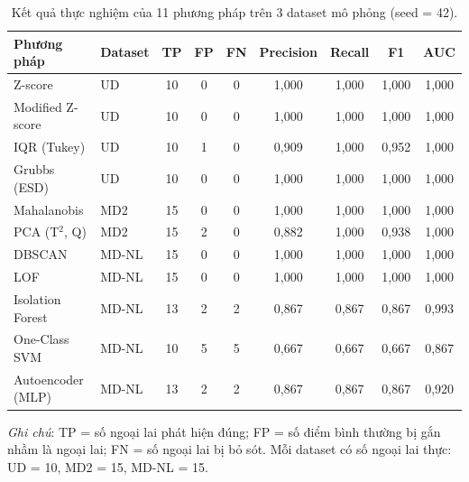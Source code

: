 \begin{table}[ht]
\centering
\caption{Kết quả thực nghiệm của 11 phương pháp trên 3 dataset mô phỏng (seed = 42).}
\label{tab:experiment-results}
\small
\begin{tabular}{llccccccc}
\toprule
\textbf{Phương pháp} & \textbf{Dataset} & \textbf{TP} & \textbf{FP} & \textbf{FN} & \textbf{Precision} & \textbf{Recall} & \textbf{F1} & \textbf{AUC} \\
\midrule
Z-score & UD & 10 & 0 & 0 & 1,000 & 1,000 & 1,000 & 1,000 \\
Modified Z-score & UD & 10 & 0 & 0 & 1,000 & 1,000 & 1,000 & 1,000 \\
IQR (Tukey) & UD & 10 & 1 & 0 & 0,909 & 1,000 & 0,952 & 1,000 \\
Grubbs (ESD) & UD & 10 & 0 & 0 & 1,000 & 1,000 & 1,000 & 1,000 \\
Mahalanobis & MD2 & 15 & 0 & 0 & 1,000 & 1,000 & 1,000 & 1,000 \\
PCA (T$^2$, Q) & MD2 & 15 & 2 & 0 & 0,882 & 1,000 & 0,938 & 1,000 \\
DBSCAN & MD-NL & 15 & 0 & 0 & 1,000 & 1,000 & 1,000 & 1,000 \\
LOF & MD-NL & 15 & 0 & 0 & 1,000 & 1,000 & 1,000 & 1,000 \\
Isolation Forest & MD-NL & 13 & 2 & 2 & 0,867 & 0,867 & 0,867 & 0,993 \\
One-Class SVM & MD-NL & 10 & 5 & 5 & 0,667 & 0,667 & 0,667 & 0,867 \\
Autoencoder (MLP) & MD-NL & 13 & 2 & 2 & 0,867 & 0,867 & 0,867 & 0,920 \\
\bottomrule
\end{tabular}
\medskip

\textit{Ghi chú}: TP = số ngoại lai phát hiện đúng; FP = số điểm bình thường bị gắn nhầm là ngoại lai; FN = số ngoại lai bị bỏ sót. Mỗi dataset có số ngoại lai thực: UD = 10, MD2 = 15, MD-NL = 15.
\end{table}
